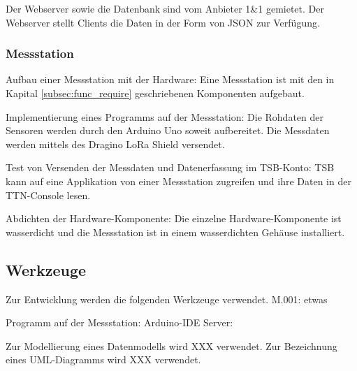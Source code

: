 Der Webserver sowie die Datenbank sind vom Anbieter 1\&1 gemietet. Der Webserver stellt Clients die Daten in der Form von JSON zur Verfügung.

\subsubsection{Messstation}
Aufbau einer Messstation mit der Hardware:
Eine Messstation ist mit den in Kapital \ref{subsec:func_require} geschriebenen Komponenten aufgebaut.

Implementierung eines Programms auf der Messstation:
Die Rohdaten der Sensoren werden durch den Arduino Uno soweit aufbereitet. Die Messdaten werden mittels des Dragino LoRa Shield versendet.

Test von Versenden der Messdaten und Datenerfassung im TSB-Konto:
TSB kann auf eine Applikation von einer Messstation zugreifen und ihre Daten in der TTN-Console lesen.

Abdichten der Hardware-Komponente:
Die einzelne Hardware-Komponente ist wasserdicht und die Messstation ist in einem wasserdichten Gehäuse installiert.

\subsection{Werkzeuge}


Zur Entwicklung werden die folgenden Werkzeuge verwendet.
M.001: etwas

Programm auf der Messstation: Arduino-IDE
Server:


Zur Modellierung eines Datenmodells wird XXX verwendet.
Zur Bezeichnung eines UML-Diagramms wird XXX verwendet.
